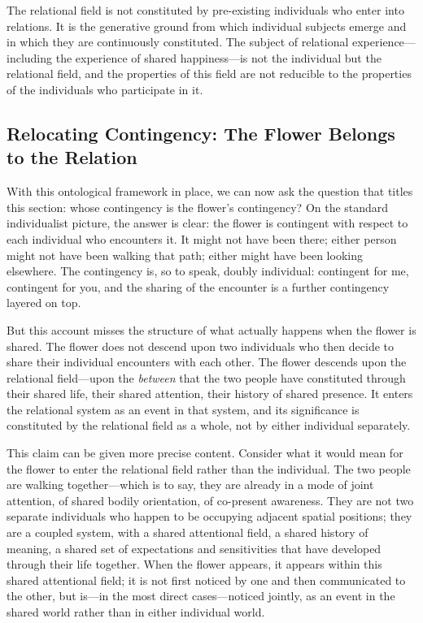 \begin{claim}
The relational field is not constituted by pre-existing individuals who enter into relations. It is the generative ground from which individual subjects emerge and in which they are continuously constituted. The subject of relational experience---including the experience of shared happiness---is not the individual but the relational field, and the properties of this field are not reducible to the properties of the individuals who participate in it.
\end{claim}

\subsection{Relocating Contingency: The Flower Belongs to the Relation}
\label{p14:subsec:contingency}

\noindent
With this ontological framework in place, we can now ask the question that titles this section: whose contingency is the flower's contingency? On the standard individualist picture, the answer is clear: the flower is contingent with respect to each individual who encounters it. It might not have been there; either person might not have been walking that path; either might have been looking elsewhere. The contingency is, so to speak, doubly individual: contingent for me, contingent for you, and the sharing of the encounter is a further contingency layered on top.

But this account misses the structure of what actually happens when the flower is shared. The flower does not descend upon two individuals who then decide to share their individual encounters with each other. The flower descends upon the relational field---upon the \emph{between} that the two people have constituted through their shared life, their shared attention, their history of shared presence. It enters the relational system as an event in that system, and its significance is constituted by the relational field as a whole, not by either individual separately.

This claim can be given more precise content. Consider what it would mean for the flower to enter the relational field rather than the individual. The two people are walking together---which is to say, they are already in a mode of joint attention, of shared bodily orientation, of co-present awareness. They are not two separate individuals who happen to be occupying adjacent spatial positions; they are a coupled system, with a shared attentional field, a shared history of meaning, a shared set of expectations and sensitivities that have developed through their life together. When the flower appears, it appears within this shared attentional field; it is not first noticed by one and then communicated to the other, but is---in the most direct cases---noticed jointly, as an event in the shared world rather than in either individual world.

